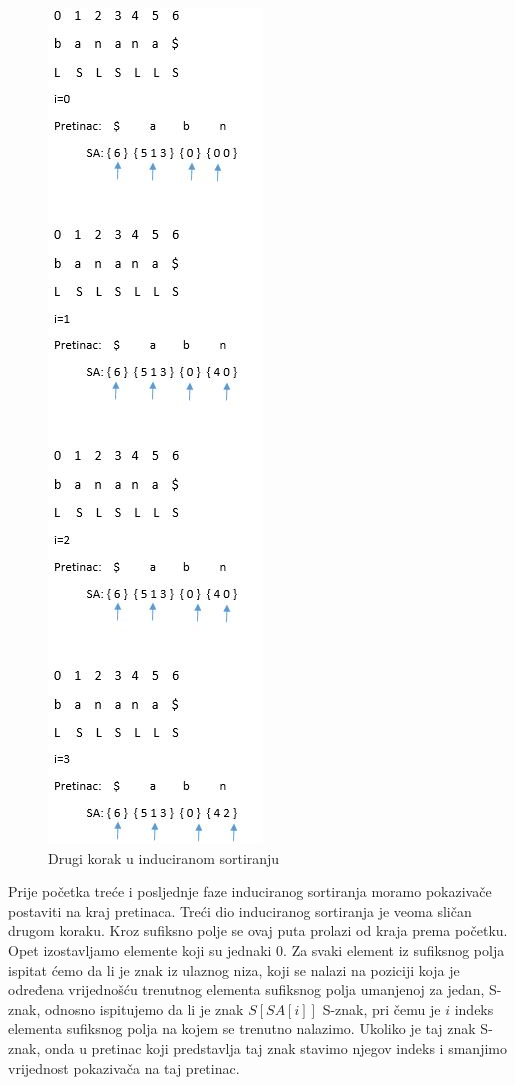 \begin{figure}[H]
   \centering
       \includegraphics{./pictures/SAISstep2.jpg}
 \caption{Drugi korak u induciranom sortiranju}
 \label{fig:sais2}
\end{figure}

Prije početka treće i posljednje faze induciranog sortiranja moramo pokazivače postaviti na kraj pretinaca. Treći dio induciranog sortiranja je veoma sličan drugom koraku. Kroz sufiksno polje se ovaj puta prolazi od kraja prema početku. Opet izostavljamo elemente koji su jednaki 0.  Za svaki element iz sufiksnog polja ispitat ćemo da li je znak iz ulaznog niza, koji se nalazi na poziciji koja je određena vrijednošću trenutnog elementa sufiksnog polja umanjenoj za jedan, S-znak, odnosno ispitujemo da li je znak $S[SA[i]]$ S-znak, pri čemu je $i$ indeks elementa sufiksnog polja na kojem se trenutno nalazimo. Ukoliko je taj znak S-znak, onda u pretinac koji predstavlja taj znak stavimo njegov indeks i smanjimo vrijednost pokazivača na taj pretinac. 

